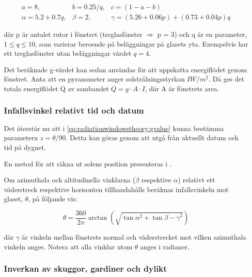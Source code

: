 \begin{eqnarray}
a = 8, & b = 0.25/q, & c = (1-a-b) \nonumber \\
\alpha = 5.2 + 0.7q, & \beta = 2, & \gamma = (5.26+0.06p) + (0.73+0.04p)q
\end{eqnarray}

där p är antalet rutor i fönstret (treglasfönster $\Rightarrow$ p = 3) och q är en parameter, $1 \le q \le 10$, som varierar beroende på beläggningar på glasets yta. Exempelvis har ett treglasfönster utan beläggningar värdet $q=4$.

Det beräknade g-värdet kan sedan användas för att uppskatta energiflödet genom fönstret. Anta att en pyranometer anger solstrålningsstyrkan $\unit{I}{W/m^2}$. Då ges det totala energiflödet Q av sambandet $Q = g \cdot A \cdot I$, där A är fönstrets area.

\subsubsection{Infallsvinkel relativt tid och datum}

Det återstår nu att i \eqref{eq:radiationwindowstheory:gvalue} kunna bestämma parametern $z = \theta/90$. Detta kan göras genom att utgå från aktuellt datum och tid på dygnet.

En metod för att räkna ut solens position presenteras i \cite{walraven78}.

Om azimuthala och altitudinella vinklarna ($\beta$ respektive $\alpha$) relativt ett väderstreck respektive horisonten tillhandahålls beräknas infallsvinkeln mot glaset, $\theta$, på följande vis:

\begin{equation} 
\theta = \frac{360}{2\pi}\arctan{\left( \sqrt{\tan{\alpha}^2 + \tan{\beta - \gamma}^2} \right)}
\end{equation}

där $\gamma$ är vinkeln mellan fönstrets normal och väderstrecket mot vilken azimuthala vinkeln anges. Notera att alla vinklar utom $\theta$ anges i radianer.

\subsubsection{Inverkan av skuggor, gardiner och dylikt}


\begin{comment}
Simmler & Binder
Experimental and numerical determination of the total solar energy transmittance of glazing with venetian blind shading
\end{comment}

